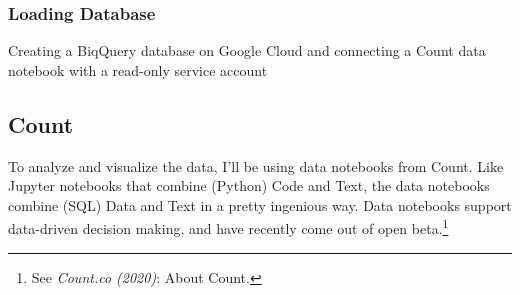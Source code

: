 \subsubsection{Loading Database}

Creating a BiqQuery database on Google Cloud and connecting a Count data notebook with a read-only service account

\subsection{Count}

To analyze and visualize the data, I'll be using data notebooks from Count. Like Jupyter notebooks that combine (Python) Code and Text, the data notebooks combine (SQL) Data and Text in a pretty ingenious way. Data notebooks support data-driven decision making, and have recently come out of open beta.\footnote{See \textit{Count.co (2020)}: About Count.\cite{aboutCount}}
